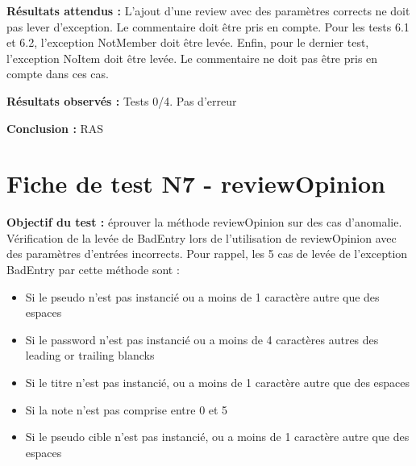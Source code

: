\documentclass[12pt,a4paper]{report}
\begin{document}
\textbf{Résultats attendus :}
	L'ajout d'une review avec des paramètres corrects ne doit pas lever d'exception. Le commentaire doit être pris en compte. Pour les tests 6.1 et 6.2, l'exception NotMember doit être levée. Enfin, pour le dernier test, l'exception NoItem doit être levée. Le commentaire ne doit pas être pris en compte dans ces cas.

\textbf{Résultats observés :}
Tests 0/4. Pas d'erreur

\textbf{Conclusion : }RAS

\chapter{Fiche de test N7 - reviewOpinion}
 
\textbf{Objectif du test : }éprouver la méthode reviewOpinion sur des cas d'anomalie.
Vérification de la levée de BadEntry lors de l’utilisation de reviewOpinion avec des paramètres d'entrées incorrects.
Pour rappel, les 5 cas de levée de l'exception BadEntry par cette méthode sont :
\begin{itemize}
	\item	Si le pseudo n'est pas instancié ou a moins de 1 caractère autre que des espaces
	\item	Si le password n'est pas instancié ou a moins de 4 caractères autres des leading or trailing blancks
	\item	Si le titre n'est pas instancié, ou a moins de 1 caractère autre que des espaces
	\item	Si la note n’est pas comprise entre 0 et 5
	\item	Si le pseudo cible n’est pas instancié, ou a moins de 1 caractère autre que des espaces

\end{itemize}
\end{document}
